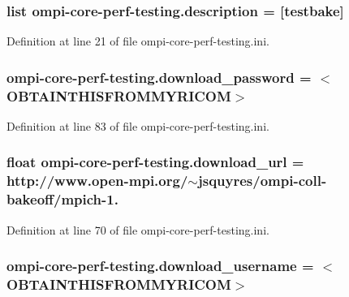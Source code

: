 \hypertarget{namespaceompi-core-perf-testing_a13c12ad10d2eefbe42582df0b6368e00}{
\subsubsection[{description}]{\setlength{\rightskip}{0pt plus 5cm}list ompi-\/core-\/perf-\/testing.\-description = \mbox{[}testbake\mbox{]}}}\label{namespaceompi-core-perf-testing_a13c12ad10d2eefbe42582df0b6368e00}


Definition at line 21 of file ompi-\/core-\/perf-\/testing.\-ini.

\hypertarget{namespaceompi-core-perf-testing_a5631c42bb25bbe102375dc4662d3b632}{
\subsubsection[{download\-\_\-password}]{\setlength{\rightskip}{0pt plus 5cm}ompi-\/core-\/perf-\/testing.\-download\-\_\-password = $<$O\-B\-T\-A\-I\-N\-T\-H\-I\-S\-F\-R\-O\-M\-M\-Y\-R\-I\-C\-O\-M$>$}}\label{namespaceompi-core-perf-testing_a5631c42bb25bbe102375dc4662d3b632}


Definition at line 83 of file ompi-\/core-\/perf-\/testing.\-ini.

\hypertarget{namespaceompi-core-perf-testing_a9a59a4bdb97826cfdd8302d83ef6fa02}{
\subsubsection[{download\-\_\-url}]{\setlength{\rightskip}{0pt plus 5cm}float ompi-\/core-\/perf-\/testing.\-download\-\_\-url = http\-://www.\-open-\/mpi.\-org/$\sim$jsquyres/ompi-\/coll-\/bakeoff/mpich-\/1.}}\label{namespaceompi-core-perf-testing_a9a59a4bdb97826cfdd8302d83ef6fa02}


Definition at line 70 of file ompi-\/core-\/perf-\/testing.\-ini.

\hypertarget{namespaceompi-core-perf-testing_a6e85e7b19cb6b339f8ed30ecbc658553}{
\subsubsection[{download\-\_\-username}]{\setlength{\rightskip}{0pt plus 5cm}ompi-\/core-\/perf-\/testing.\-download\-\_\-username = $<$O\-B\-T\-A\-I\-N\-T\-H\-I\-S\-F\-R\-O\-M\-M\-Y\-R\-I\-C\-O\-M$>$}}\label{namespaceompi-core-perf-testing_a6e85e7b19cb6b339f8ed30ecbc658553}


